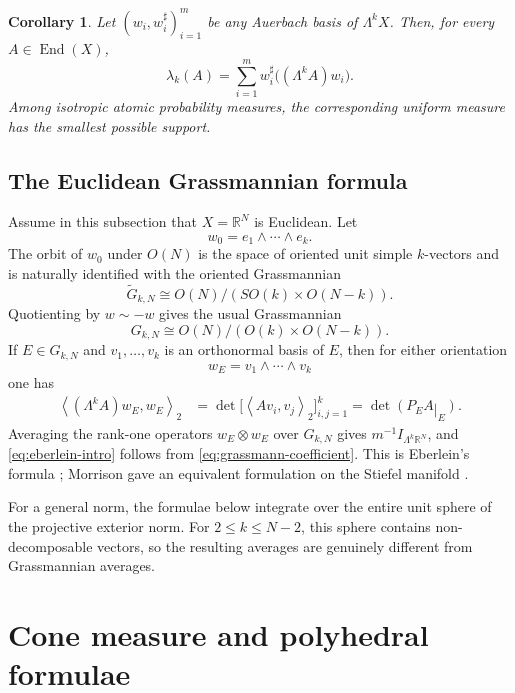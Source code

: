 \documentclass[11pt,a4paper]{amsart}
\numberwithin{equation}{section}
\theoremstyle{plain}
\newtheorem{corollary}[theorem]{Corollary}
\theoremstyle{definition}
\theoremstyle{remark}
\DeclareMathOperator{\End}{End}
\newcommand{\R}{\mathbb{R}}
\newcommand{\Id}{I}
\newcommand{\ip}[2]{\left\langle #1,#2\right\rangle_2}
\newcommand{\restr}{\mathbin{|}}
\begin{document}
\begin{corollary}\label{cor:auerbach-higher}
Let $(w_i,w_i^\sharp)_{i=1}^m$ be any Auerbach basis of $\Lambda^kX$. Then, for every $A\in\End(X)$,
\begin{equation}\label{eq:auerbach-higher}
\lambda_k(A)=\sum_{i=1}^m w_i^\sharp\big((\Lambda^kA)w_i\big).
\end{equation}
Among isotropic atomic probability measures, the corresponding uniform measure has the smallest possible support.
\end{corollary}

\subsection{The Euclidean Grassmannian formula}

Assume in this subsection that $X=\R^N$ is Euclidean. Let
\[
w_0=e_1\wedge\cdots\wedge e_k.
\]
The orbit of $w_0$ under $O(N)$ is the space of oriented unit simple $k$-vectors and is naturally identified with the oriented Grassmannian
\[
\widetilde G_{k,N}\cong O(N)/(SO(k)\times O(N-k)).
\]
Quotienting by $w\sim-w$ gives the usual Grassmannian
\[
G_{k,N}\cong O(N)/(O(k)\times O(N-k)).
\]
If $E\in G_{k,N}$ and $v_1,\ldots,v_k$ is an orthonormal basis of $E$, then for either orientation
\[
w_E=v_1\wedge\cdots\wedge v_k
\]
one has
\begin{align}\label{eq:grassmann-coefficient}
\ip{(\Lambda^kA)w_E}{w_E}
&=\det\big[\ip{Av_i}{v_j}\big]_{i,j=1}^k
=\det(P_EA\restr_E).
\end{align}
Averaging the rank-one operators $w_E\otimes w_E$ over $G_{k,N}$ gives $m^{-1}\Id_{\Lambda^k\R^N}$, and \eqref{eq:eberlein-intro} follows from \eqref{eq:grassmann-coefficient}. This is Eberlein's formula \cite{Eberlein}; Morrison gave an equivalent formulation on the Stiefel manifold \cite{MorrisonHigher}.

For a general norm, the formulae below integrate over the entire unit sphere of the projective exterior norm. For $2\leqslant k\leqslant N-2$, this sphere contains non-decomposable vectors, so the resulting averages are genuinely different from Grassmannian averages.

\section{Cone measure and polyhedral formulae}\label{sec:cone}
\end{document}
